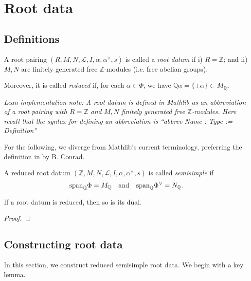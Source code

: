 \chapter{Root data}
\label{cha:construction-root-systems}
\section{Definitions}
\begin{definition}
    \label{def:root-datum}
    \leanok
     A root pairing $(R,M,N,\mathcal{L},I,\alpha, \alpha^\vee,s)$ is called a {\it root datum} if 
    i) $R = \mathbb{Z}$; and ii) $M,N$ are finitely generated free $\mathbb{Z}$-modules (i.e. free abelian groups).
    
    Moreover, it is called {\it reduced} if, for each $\alpha \in \Phi$, we have 
    $\mathbb{Q}\alpha = \{\pm \alpha\} \subset M_{\mathbb{Q}}$.
\end{definition}

{\it Lean implementation note: A root datum is defined in Mathlib as an abbreviation of 
a root pairing with $R = \mathbb{Z}$ and $M,N$ finitely generated free $\mathbb{Z}$-modules. Here 
recall that the syntax for defining an abbreviation is ``abbrev Name : Type := Definition"}

For the following, we diverge from Mathlib's current terminology, preferring the definition in 
by B. Conrad. 
\begin{definition}
    \label{def:rp-semisimple}
    \leanok
    A reduced root datum $(\mathbb{Z},M,N,\mathcal{L},I,\alpha, \alpha^\vee,s)$ is called {\it semisimple} if
    \[
        {\rm span}_{\mathbb{Q}} \Phi = M_{\mathbb{Q}} \quad \text{and} \quad {\rm span}_{\mathbb{Q}} \Phi^\vee = N_{\mathbb{Q}}.
    \] 
\end{definition}

\begin{lemma}
    If a root datum is reduced, then so is its dual. 
\end{lemma}
\begin{proof}
    
\end{proof}

\section{Constructing root data}
In this section, we construct reduced semisimple root data. We begin with a 
key lemma. 

